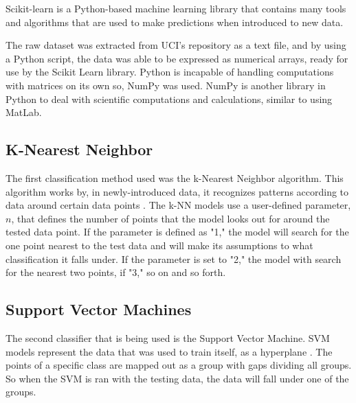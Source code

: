 \documentclass[conference,compsoc]{IEEEtran}
\begin{document}
Scikit-learn  is a Python-based machine learning library that contains many tools and algorithms that are used to make predictions when introduced to new data. 

The raw dataset was extracted from UCI's repository as a text file, and by using a Python script, the data was able to be expressed as numerical arrays, ready for use by the Scikit Learn library. Python is incapable of handling computations with matrices on its own so, NumPy was used. NumPy is another library in Python to deal with scientific computations and calculations, similar to using MatLab.

\subsection{K-Nearest Neighbor}
The first classification method used was the k-Nearest Neighbor algorithm.  This algorithm works by, in newly-introduced data, it recognizes patterns according to data around certain data points \cite{random}. The k-NN models use a user-defined parameter, $n$, that defines the number of points that the model looks out for around the tested data point. If the parameter is defined as "1," the model will search for the one point nearest to the test data and will make its assumptions to what classification it falls under. If the parameter is set to "2," the model with search for the nearest two points, if "3," so on and so forth.   

\subsection{Support Vector Machines}
The second classifier that is being used is the Support Vector Machine. SVM models represent the data that was used to train itself, as a hyperplane \cite{classsvm}. The points of a specific class are mapped out as a group with gaps dividing all groups. So when the SVM is ran with the testing data, the data will fall under one of the groups. 
\end{document}

